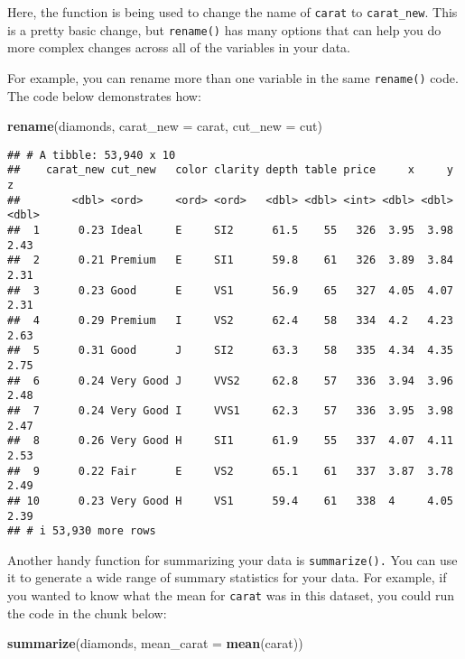\documentclass[
]{article}
\newenvironment{Shaded}{\begin{snugshade}}{\end{snugshade}}
\newcommand{\AttributeTok}[1]{\textcolor[rgb]{0.13,0.29,0.53}{#1}}
\newcommand{\FunctionTok}[1]{\textcolor[rgb]{0.13,0.29,0.53}{\textbf{#1}}}
\newcommand{\NormalTok}[1]{#1}
\begin{document}
Here, the function is being used to change the name of \texttt{carat} to
\texttt{carat\_new}. This is a pretty basic change, but
\texttt{rename()} has many options that can help you do more complex
changes across all of the variables in your data.

For example, you can rename more than one variable in the same
\texttt{rename()} code. The code below demonstrates how:

\begin{Shaded}
\begin{Highlighting}[]
\FunctionTok{rename}\NormalTok{(diamonds, }\AttributeTok{carat\_new =}\NormalTok{ carat, }\AttributeTok{cut\_new =}\NormalTok{ cut)}
\end{Highlighting}
\end{Shaded}

\begin{verbatim}
## # A tibble: 53,940 x 10
##    carat_new cut_new   color clarity depth table price     x     y     z
##        <dbl> <ord>     <ord> <ord>   <dbl> <dbl> <int> <dbl> <dbl> <dbl>
##  1      0.23 Ideal     E     SI2      61.5    55   326  3.95  3.98  2.43
##  2      0.21 Premium   E     SI1      59.8    61   326  3.89  3.84  2.31
##  3      0.23 Good      E     VS1      56.9    65   327  4.05  4.07  2.31
##  4      0.29 Premium   I     VS2      62.4    58   334  4.2   4.23  2.63
##  5      0.31 Good      J     SI2      63.3    58   335  4.34  4.35  2.75
##  6      0.24 Very Good J     VVS2     62.8    57   336  3.94  3.96  2.48
##  7      0.24 Very Good I     VVS1     62.3    57   336  3.95  3.98  2.47
##  8      0.26 Very Good H     SI1      61.9    55   337  4.07  4.11  2.53
##  9      0.22 Fair      E     VS2      65.1    61   337  3.87  3.78  2.49
## 10      0.23 Very Good H     VS1      59.4    61   338  4     4.05  2.39
## # i 53,930 more rows
\end{verbatim}

Another handy function for summarizing your data is
\texttt{summarize().} You can use it to generate a wide range of summary
statistics for your data. For example, if you wanted to know what the
mean for \texttt{carat} was in this dataset, you could run the code in
the chunk below:

\begin{Shaded}
\begin{Highlighting}[]
\FunctionTok{summarize}\NormalTok{(diamonds, }\AttributeTok{mean\_carat =} \FunctionTok{mean}\NormalTok{(carat))}
\end{Highlighting}
\end{Shaded}
\end{document}
